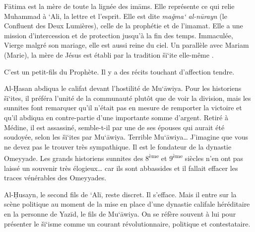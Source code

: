 Fātima est la mère de toute la lignée des imāms. Elle représente ce qui
relie Muhammad à `Ali, la lettre et l'esprit. Elle est dite \emph{maǧma`
al-nūrayn} (le Confluent des Deux Lumières), celle de la prophétie et de
l'imamat. Elle a une mission d'intercession et de protection jusqu'à la
fin des temps. Immaculée, Vierge malgré son mariage, elle est aussi
reine du ciel. Un parallèle avec Mariam (Marie), la mère de Jésus est
établi par la tradition šī`ite elle-même .


C'est un petit-fils du Prophète. Il y a des récits touchant d'affection
tendre.

Al-Ḥasan abdiqua le califat devant l'hostilité de Mu`āwiya. Pour les
historiens šī`ites, il préféra l'unité de la communauté plutôt que de
voir la division, mais les sunnites font remarquer qu'il n'était pas en
mesure de remporter la victoire et qu'il abdiqua en contre-partie d'une
importante somme d'argent. Retiré à Médine, il est assassiné,
semble-t-il par une de ses épouses qui aurait été soudoyée, selon les
šī`ites par Mu`āwiya. Terrible Mu`āwiya\ldots{} J'imagine que vous ne
devez pas le trouver très sympathique. Il est le fondateur de la
dynastie Omeyyade. Les grands historiens sunnites des
8\textsuperscript{ème} et 9\textsuperscript{ème} siècles n'en ont pas
laissé un souvenir très élogieux\ldots{} car ils sont abbassides et il
fallait effacer les traces vénérables des Omeyyades.


Al-Ḥusayn, le second fils de `Alī, reste discret. Il s'efface. Mais il
entre sur la scène politique au moment de la mise en place d'une
dynastie califale héréditaire en la personne de Yazīd, le fils de
Mu`āwiya. On se réfère souvent à lui pour présenter le šī`isme comme un
courant révolutionnaire, politique et contestataire.

